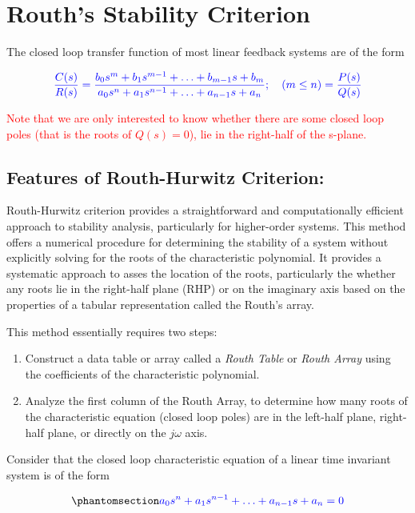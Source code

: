 \documentclass[
  14pt,
  a4paper,
  oneside,
  open=any,
  a4paper,
  14pt]{report}
\begin{document}
\section{Routh's Stability Criterion}\label{rouths-stability-criterion}

The closed loop transfer function of most linear feedback systems are of
the form

\[
    \textcolor{blue}{\dfrac{C(s)}{R(s)} = \dfrac{b_0s^m + b_1s^{m-1}+\ldots+b_{m-1}s +b_m}{a_0s^n + a_1s^{n-1}+\ldots+a_{n-1}s +a_n}; \quad (m \leq n) = \dfrac{P(s)}{Q(s)}}
\]

\textcolor{red}{Note that we are only interested to know whether there
are some closed loop poles (that is the roots of \(Q(s) = 0\)), lie in
the right-half of the s-plane.}

\subsection{Features of Routh-Hurwitz
Criterion:}\label{features-of-routh-hurwitz-criterion}

Routh-Hurwitz criterion provides a straightforward and computationally
efficient approach to stability analysis, particularly for higher-order
systems. This method offers a numerical procedure for determining the
stability of a system without explicitly solving for the roots of the
characteristic polynomial. It provides a systematic approach to asses
the location of the roots, particularly the whether any roots lie in the
right-half plane (RHP) or on the imaginary axis based on the properties
of a tabular representation called the Routh's array.

This method essentially requires two steps:

\begin{enumerate}
\def\labelenumi{\arabic{enumi}.}
\item
  Construct a data table or array called a \emph{Routh Table} or
  \emph{Routh Array} using the coefficients of the characteristic
  polynomial.
\item
  Analyze the first column of the Routh Array, to determine how many
  roots of the characteristic equation (closed loop poles) are in the
  left-half plane, right-half plane, or directly on the \(j\omega\)
  axis.
\end{enumerate}

Consider that the closed loop characteristic equation of a linear time
invariant system is of the form

\begin{equation}\phantomsection\label{eq-routh-characteristic-equation}{
    \textcolor{blue}{a_0 s^n + a_1 s^{n-1} + \ldots + a_{n-1}s + a_n = 0}
}\end{equation}
\end{document}
